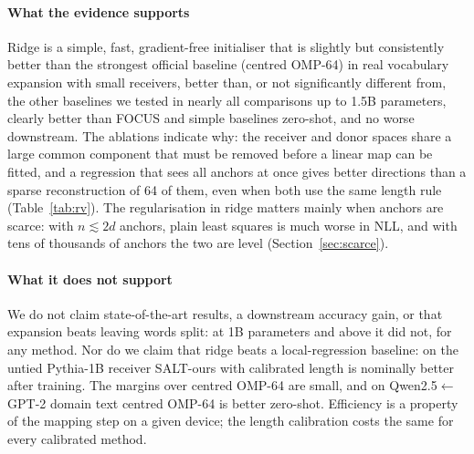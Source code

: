 \documentclass[preprint,12pt]{elsarticle}
\begin{document}
\paragraph{What the evidence supports} Ridge is a simple, fast, gradient-free initialiser that is slightly but consistently better than the strongest official baseline (centred OMP-64) in real vocabulary expansion with small receivers, better than, or not significantly different from, the other baselines we tested in nearly all comparisons up to 1.5B parameters, clearly better than FOCUS and simple baselines zero-shot, and no worse downstream. The ablations indicate why: the receiver and donor spaces share a large common component that must be removed before a linear map can be fitted, and a regression that sees all anchors at once gives better directions than a sparse reconstruction of 64 of them, even when both use the same length rule (Table~\ref{tab:rv}). The regularisation in ridge matters mainly when anchors are scarce: with $n\lesssim 2d$ anchors, plain least squares is much worse in NLL, and with tens of thousands of anchors the two are level (Section~\ref{sec:scarce}).

\paragraph{What it does not support} We do not claim state-of-the-art results, a downstream accuracy gain, or that expansion beats leaving words split: at 1B parameters and above it did not, for any method. Nor do we claim that ridge beats a local-regression baseline: on the untied Pythia-1B receiver SALT-ours with calibrated length is nominally better after training. The margins over centred OMP-64 are small, and on Qwen2.5$\leftarrow$GPT-2 domain text centred OMP-64 is better zero-shot. Efficiency is a property of the mapping step on a given device; the length calibration costs the same for every calibrated method.
\end{document}
